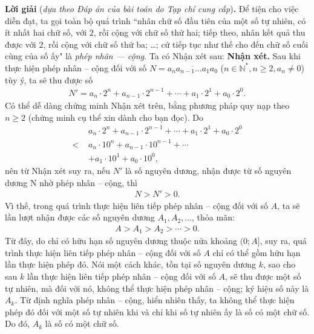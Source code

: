 \begin{multicols}{2}
	\textbf{\color{thachthuctoanhoc}Lời giải} (\textit{dựa theo Đáp án của bài toán do Tạp chí cung cấp})\textbf{\color{thachthuctoanhoc}.}
	\vskip 0.05cm
	Để tiện cho việc diễn đạt, ta gọi toàn bộ quá trình ``nhân chữ số đầu tiên của một số tự nhiên, có ít nhất hai chữ số, với $2$, rồi cộng với chữ số thứ hai; tiếp theo, nhân kết quả thu được với $2$, rồi cộng với chữ số thứ ba; \ldots; cứ tiếp tục như thế cho đến chữ số cuối cùng của số ấy" là \textit{phép nhân --- cộng}.
	\vskip 0.05cm
	Ta có Nhận xét sau:
	\vskip 0.05cm
	\textbf{\color{thachthuctoanhoc}Nhận xét.} Sau khi thực hiện phép nhân -- cộng đối với số $N = \overline {{a_n}{a_{n - 1}} \ldots {a_1}{a_0}} $ ($n \in \mathbb{N^*}, n \ge 2, a_n \ne 0$) tùy ý, ta sẽ thu được số
	\begin{align*}
		N' \!=\! {a_n} \!\cdot\! {2^n} \!+\! {a_{n \!-\! 1}} \!\cdot\! {2^{n \!-\! 1}} \!+\!  \!\cdots\!  +\! {a_1} \!\cdot\! {2^1} \!+\! {a_0} \!\cdot\! {2^0}.
	\end{align*}
	Có thể dễ dàng chứng minh Nhận xét trên, bằng phương pháp quy nạp theo $n \ge 2$ (chứng minh cụ thể xin dành cho bạn đọc).
	\vskip 0.05cm
	Do
	\begin{align*}
		&{a_n} \!\cdot\! {2^n} \!+\! {a_{n - 1}} \!\cdot\! {2^{n \!-\! 1}} \!+\!  \cdots  \!+\! {a_1} \!\cdot\! {2^1} \!+\! {a_0} \!\cdot\! {2^0} \\
		< \,\,&{a_n} \cdot {10^n} + {a_{n - 1}} \cdot {10^{n - 1}} +  \cdots  \\
		&+ {a_1} \cdot {10^1} + {a_0} \cdot {10^0},
	\end{align*}
	nên từ Nhận xét suy ra, nếu $N'$  là số nguyên dương, nhận được từ số nguyên dương N nhờ phép nhân -- cộng, thì
	\begin{align*}
		N > N' > 0.
	\end{align*}
	Vì thế, trong quá trình thực hiện liên tiếp phép nhân -- cộng đối với số $A$, ta sẽ lần lượt nhận được các số nguyên dương   $A_1, A_2, \ldots$, thỏa mãn:
	\begin{align*}
		A > {A_1} > {A_2} >  \cdots  > 0.
	\end{align*}
	Từ đây, do chỉ có hữu hạn số nguyên dương thuộc nửa khoảng $(0; A]$, suy ra, quá trình thực hiện liên tiếp phép nhân -- cộng đối với số $A$ chỉ có thể gồm hữu hạn lần thực hiện phép đó. Nói một cách khác, tồn tại số nguyên dương $k$, sao cho sau $k$ lần thực hiện liên tiếp phép nhân -- cộng đối với số $A$, sẽ thu được một số tự nhiên, mà đối với nó, không thể thực hiện phép nhân -- cộng; ký hiệu số này là $A_k$.
	\vskip 0.05cm
	Từ định nghĩa phép nhân -- cộng, hiển nhiên thấy, ta không thể thực hiện phép đó đối với một số tự nhiên khi và chỉ khi số tự nhiên ấy là số có một chữ số. Do đó, $A_k$  là số có một chữ số.

\end{multicols}

